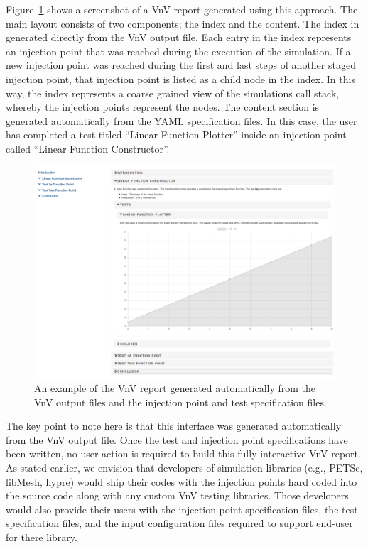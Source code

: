 Figure~\ref{rendered-example} shows a screenshot of a VnV report generated using this approach. The main layout consists of two components; the index and the content. The index in generated directly from the VnV output file. Each entry in the index represents an injection point that was reached during the execution of the simulation. If a new injection point was reached during the first and last steps of another staged injection point, that injection point is listed as a child node in the index. In this way, the index represents a coarse grained view of the simulations call stack, whereby the injection points represent the nodes. The content section is generated automatically from the YAML specification files. In this case, the user has completed a test titled ``Linear Function Plotter'' inside an injection point called ``Linear Function Constructor''. 

\begin{figure}
 \includegraphics[width=\textwidth]{./Figures/render-example.PNG}
\caption{ An example of the VnV report generated automatically from the VnV output files and the injection point and test specification files. \label{rendered-example}}
 \end{figure}


The key point to note here is that this interface was generated automatically from the VnV output file. Once the test and injection point specifications have been written, no user action 
is required to build this fully interactive VnV report. As stated earlier, we envision that developers of simulation libraries (e.g., PETSc, libMesh, hypre) would ship their codes with the injection 
points hard coded into the source code along with any custom VnV testing libraries. Those developers would also provide their users with the injection point specification files, the test specification
files, and the input configuration files required to support end-user \VV for there library.

